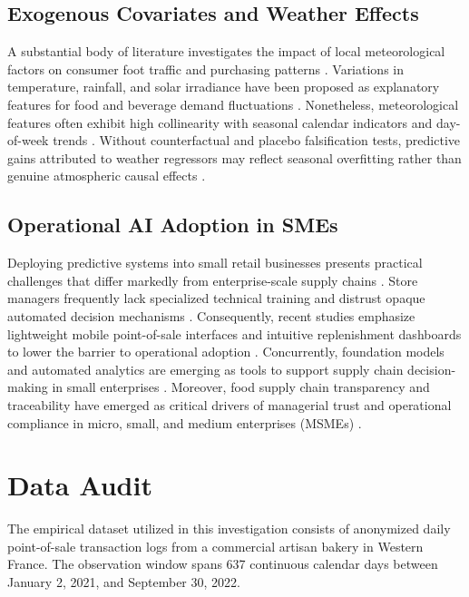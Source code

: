 \documentclass[conference]{IEEEtran}
\begin{document}
\subsection{Exogenous Covariates and Weather Effects}
A substantial body of literature investigates the impact of local meteorological factors on consumer foot traffic and purchasing patterns \cite{guler2023forecasting, lalitha2025enhanced}. Variations in temperature, rainfall, and solar irradiance have been proposed as explanatory features for food and beverage demand fluctuations \cite{jain2024weather}. Nonetheless, meteorological features often exhibit high collinearity with seasonal calendar indicators and day-of-week trends \cite{guler2023forecasting}. Without counterfactual and placebo falsification tests, predictive gains attributed to weather regressors may reflect seasonal overfitting rather than genuine atmospheric causal effects \cite{lalitha2025enhanced}.

\subsection{Operational AI Adoption in SMEs}
Deploying predictive systems into small retail businesses presents practical challenges that differ markedly from enterprise-scale supply chains \cite{groene2024introduction}. Store managers frequently lack specialized technical training and distrust opaque automated decision mechanisms \cite{yuniarty2025technology}. Consequently, recent studies emphasize lightweight mobile point-of-sale interfaces and intuitive replenishment dashboards to lower the barrier to operational adoption \cite{icci2026mobile, icalter2024mobile}. Concurrently, foundation models and automated analytics are emerging as tools to support supply chain decision-making in small enterprises \cite{sera2025optimizing}. Moreover, food supply chain transparency and traceability have emerged as critical drivers of managerial trust and operational compliance in micro, small, and medium enterprises (MSMEs) \cite{timesicon2025technology}.

\section{Data Audit}
\label{sec:data}
The empirical dataset utilized in this investigation consists of anonymized daily point-of-sale transaction logs from a commercial artisan bakery in Western France. The observation window spans 637 continuous calendar days between January 2, 2021, and September 30, 2022.
\end{document}
